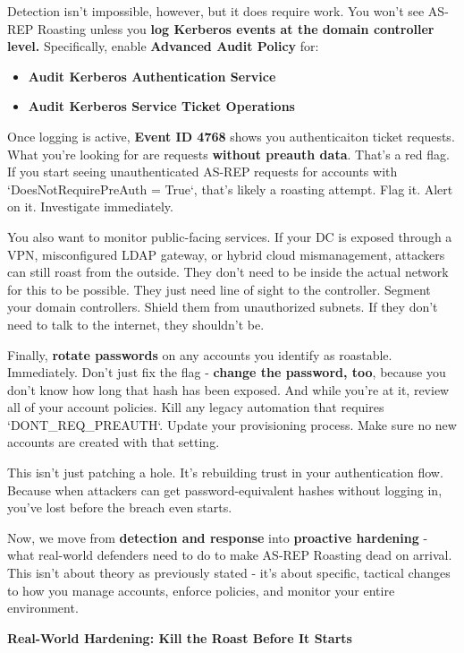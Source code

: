 Detection isn’t impossible, however, but it does require work. You won’t see AS-REP Roasting unless you \textbf{log Kerberos events at the domain controller level. }Specifically, enable \textbf{Advanced Audit Policy} for:


\begin{itemize}
    \item \textbf{\textbf{Audit Kerberos Authentication Service}}
    \item \textbf{\textbf{Audit Kerberos Service Ticket Operations}}
\end{itemize}
Once logging is active, \textbf{Event ID 4768} shows you authenticaiton ticket requests. What you’re looking for are requests \textbf{without preauth data}. That’s a red flag. If you start seeing unauthenticated AS-REP requests for accounts with `DoesNotRequirePreAuth = True`, that’s likely a roasting attempt. Flag it. Alert on it. Investigate immediately.

You also want to monitor public-facing services. If your DC is exposed through a VPN, misconfigured LDAP gateway, or hybrid cloud mismanagement, attackers can still roast from the outside. They don’t need to be inside the actual network for this to be possible. They just need line of sight to the controller. Segment your domain controllers. Shield them from unauthorized subnets. If they don’t need to talk to the internet, they shouldn’t be.

Finally, \textbf{rotate passwords} on any accounts you identify as roastable. Immediately. Don’t just fix the flag - \textbf{change the password, too}, because you don’t know how long that hash has been exposed. And while you’re at it, review all of your account policies. Kill any legacy automation that requires `DONT\_REQ\_PREAUTH`. Update your provisioning process. Make sure no new accounts are created with that setting.

This isn’t just patching a hole. It’s rebuilding trust in your authentication flow. Because when attackers can get password-equivalent hashes without logging in, you’ve lost before the breach even starts.

Now, we move from \textbf{detection and response} into \textbf{proactive hardening} - what real-world defenders need to do to make AS-REP Roasting dead on arrival. This isn’t about theory as previously stated - it’s about specific, tactical changes to how you manage accounts, enforce policies, and monitor your entire environment.

\textbf{Real-World Hardening: Kill the Roast Before It Starts}

